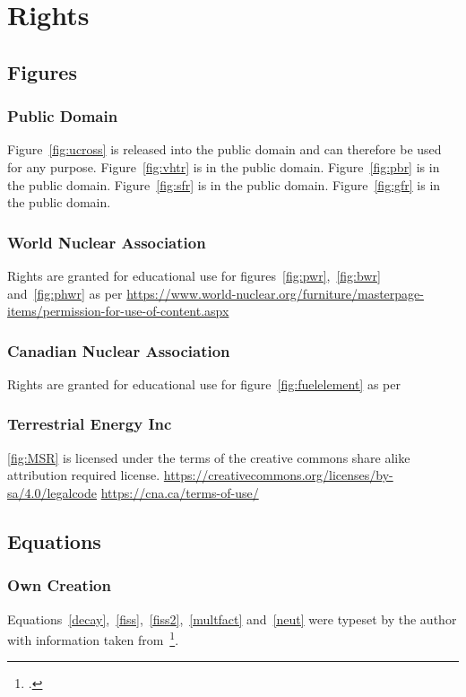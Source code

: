 \chapter{Rights}
\section{Figures}
\subsection{Public Domain}
Figure~\ref{fig:ucross} is released into the public domain and can therefore be used for any purpose.
Figure~\ref{fig:vhtr} is in the public domain.
Figure~\ref{fig:pbr} is in the public domain.
Figure~\ref{fig:sfr} is in the public domain.
Figure~\ref{fig:gfr} is in the public domain.
\subsection{World Nuclear Association}
Rights are granted for educational use for figures~\ref{fig:pwr},~\ref{fig:bwr} and~\ref{fig:phwr}
as per \url{https://www.world-nuclear.org/furniture/masterpage-items/permission-for-use-of-content.aspx}
\subsection{Canadian Nuclear Association}
Rights are granted for educational use for figure~\ref{fig:fuelelement} as per
\subsection{Terrestrial Energy Inc}
\ref{fig:MSR} is licensed under the terms of the creative commons share alike attribution required
license. \url{https://creativecommons.org/licenses/by-sa/4.0/legalcode}
\url{https://cna.ca/terms-of-use/}
\section{Equations}
\subsection{Own Creation}
Equations~\ref{decay},~\ref{fiss},~\ref{fiss2},~\ref{multfact} and~\ref{neut} were typeset by the author with
information taken from~\footcite{ReactorDesign}.